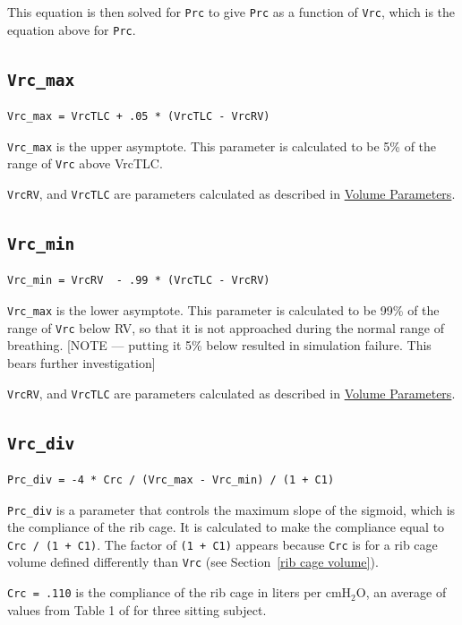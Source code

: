 \documentclass[12pt,openany,oneside]{book}
\begin{document}
This equation is then solved for \verb~Prc~ to give \verb~Prc~ as a
function of \verb~Vrc~, which is the equation above for \verb~Prc~.

\subsection{\texttt{Vrc\_max}}
\begin{verbatim}
Vrc_max = VrcTLC + .05 * (VrcTLC - VrcRV)
\end{verbatim}
\verb~Vrc_max~ is the upper asymptote. This parameter is calculated
to be 5\% of the range of \verb~Vrc~ above VrcTLC.

\verb~VrcRV~, and \verb~VrcTLC~ are parameters calculated as described
in \hyperref[Volume Parameters]{Volume Parameters}.

\subsection{\texttt{Vrc\_min}}
\begin{verbatim}
Vrc_min = VrcRV  - .99 * (VrcTLC - VrcRV)
\end{verbatim}
\verb~Vrc_max~ is the lower asymptote. This parameter is calculated
to be 99\% of the range of \verb~Vrc~ below RV, so that it is not
approached during the normal range of breathing. [NOTE --- putting it
5\% below resulted in simulation failure. This bears further
investigation]

\verb~VrcRV~, and \verb~VrcTLC~ are parameters calculated as described
in \hyperref[Volume Parameters]{Volume Parameters}.

\subsection{\texttt{Vrc\_div}}
\begin{verbatim}
Prc_div = -4 * Crc / (Vrc_max - Vrc_min) / (1 + C1)
\end{verbatim}

\verb~Prc_div~ is a parameter that controls the maximum slope of the
sigmoid, which is the compliance of the rib cage. It is calculated to
make the compliance equal to \verb~Crc / (1 + C1)~. The factor of
\verb~(1 + C1)~ appears because \verb~Crc~ is for a rib cage volume
defined differently than \verb~Vrc~ (see Section~\ref{rib cage volume}).

\verb~Crc = .110~ is the compliance of the rib cage in liters per
cmH$_2$O, an average of values from Table 1 of \citet{Gilroy01061985}
for three sitting subject.
\end{document}
